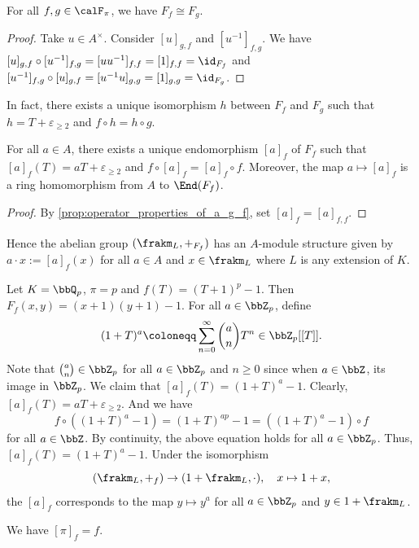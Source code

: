   \begin{corollary}
    For all $f,g \in \calF_\pi$, we have $F_f \cong F_g$.
  \end{corollary}
  \begin{proof}
    Take $u \in A^\times$.
    Consider $[u]_{g,f}$ and $[u^{-1}]_{f,g}$.
    We have $[u]_{g,f} \circ [u^{-1}]_{f,g} = [u u^{-1}]_{f,f} = [1]_{f,f} = \id_{F_f}$ and $[u^{-1}]_{f,g} \circ [u]_{g,f} = [u^{-1} u]_{g,g} = [1]_{g,g} = \id_{F_g}$.
  \end{proof}

  In fact, there exists a unique isomorphism $h$ between $F_f$ and $F_g$ such that $h = T + \varepsilon_{\geq 2}$ and $f \circ h = h \circ g$.

  \begin{corollary}
    For all $a \in A$, there exists a unique endomorphism $[a]_f$ of $F_f$ such that $[a]_f(T) = aT + \varepsilon_{\geq 2}$ and $f \circ [a]_f = [a]_f \circ f$.
    Moreover, the map $a \mapsto [a]_f$ is a ring homomorphism from $A$ to $\End(F_f)$.
  \end{corollary}
  \begin{proof}
    By \cref{prop:operator_properties_of_a_g_f}, set $[a]_f = [a]_{f,f}$.
  \end{proof}

  Hence the abelian group $(\frakm_L, +_{F_f})$ has an $A$-module structure given by $a \cdot x := [a]_f(x)$ for all $a \in A$ and $x \in \frakm_L$ where $L$ is any extension of $K$.

  \begin{example}
    Let $K = \bbQ_p$, $\pi = p$ and $f(T) = (T + 1)^p - 1$.
    Then $F_f(x,y) = (x + 1)(y + 1) - 1$.
    For all $a \in \bbZ_p$, define
    \[ (1+T)^a \coloneqq \sum_{n=0}^\infty \binom{a}{n} T^n \in \bbZ_p[[T]]. \]
    Note that $\binom{a}{n} \in \bbZ_p$ for all $a \in \bbZ_p$ and $n \geq 0$ since when $a \in \bbZ$, its image in $\bbZ_p$.
    We claim that $[a]_f(T) = (1+T)^a - 1$.
    Clearly, $[a]_f(T) = aT + \varepsilon_{\geq 2}$.
    And we have 
    \[ f \circ ((1+T)^a - 1) =  (1+T)^{ap} - 1 = ((1+T)^a - 1) \circ f \]
    for all $a \in \bbZ$.
    By continuity, the above equation holds for all $a \in \bbZ_p$.
    Thus, $[a]_f(T) = (1+T)^a - 1$.
    Under the isomorphism 
    \[ (\frakm_L, +_f) \to (1 + \frakm_L, \cdot), \quad x \mapsto 1 + x, \]
    the $[a]_f$ corresponds to the map $y \mapsto y^a$ for all $a \in \bbZ_p$ and $y \in 1 + \frakm_L$.
  \end{example}

  \begin{remark}
    We have $[\pi]_f = f$.
  \end{remark}

